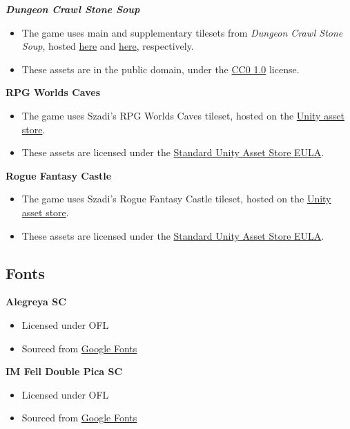 \documentclass[10pt]{article}
\begin{document}
\textbf{\textit{Dungeon Crawl Stone Soup}}
\begin{itemize}
    \item The game uses main and supplementary tilesets from \textit{Dungeon Crawl Stone Soup}, hosted \href{https://opengameart.org/content/dungeon-crawl-32x32-tiles}{here}
        and \href{https://opengameart.org/content/dungeon-crawl-32x32-tiles-supplemental}{here}, respectively.
    \item These assets are in the public domain, under the \href{https://creativecommons.org/publicdomain/zero/1.0/}{CC0 1.0} license.
\end{itemize}

\textbf{RPG Worlds Caves}
\begin{itemize}
    \item The game uses Szadi's RPG Worlds Caves tileset, hosted on the \href{https://assetstore.unity.com/packages/2d/environments/rpg-worlds-caves-167274}{Unity asset store}.
    \item These assets are licensed under the \href{https://unity3d.com/legal/as_terms}{Standard Unity Asset Store EULA}.
\end{itemize}

\textbf{Rogue Fantasy Castle}
\begin{itemize}
    \item The game uses Szadi's Rogue Fantasy Castle tileset, hosted on the \href{https://assetstore.unity.com/packages/2d/environments/rogue-fantasy-castle-164725}{Unity asset store}.
    \item These assets are licensed under the \href{https://unity3d.com/legal/as_terms}{Standard Unity Asset Store EULA}.
\end{itemize}

\subsection{Fonts}

\textbf{Alegreya SC}
\begin{itemize}
    \item Licensed under OFL
    \item Sourced from \href{https://fonts.google.com/specimen/Alegreya+SC}{Google Fonts}
\end{itemize}

\textbf{IM Fell Double Pica SC}
\begin{itemize}
    \item Licensed under OFL
    \item Sourced from \href{https://fonts.google.com/specimen/IM+Fell+Double+Pica+SC}{Google Fonts}
\end{itemize}
\end{document}
